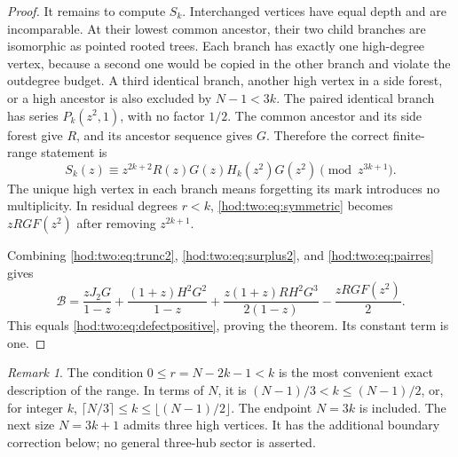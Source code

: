 \documentclass[11pt,letterpaper]{article}
\theoremstyle{definition}\newtheorem{definition}[theorem]{Definition}
\theoremstyle{remark}\newtheorem{remark}[theorem]{Remark}
\newcommand{\Bcal}{\mathcal B}
\begin{document}
\begin{proof}
It remains to compute $S_k$. Interchanged vertices have equal depth and are incomparable. At their lowest common ancestor, their two child branches are isomorphic as pointed rooted trees. Each branch has exactly one high-degree vertex, because a second one would be copied in the other branch and violate the outdegree budget. A third identical branch, another high vertex in a side forest, or a high ancestor is also excluded by $N-1<3k$. The paired identical branch has series $P_k(z^2,1)$, with no factor $1/2$. The common ancestor and its side forest give $R$, and its ancestor sequence gives $G$. Therefore the correct finite-range statement is
\begin{equation}\label{hod:two:eq:symmetric}
S_k(z)\equiv z^{2k+2}R(z)G(z)H_k(z^2)G(z^2)
\pmod {z^{3k+1}}.
\end{equation}
The unique high vertex in each branch means forgetting its mark introduces no multiplicity. In residual degrees $r<k$, \eqref{hod:two:eq:symmetric} becomes $zRGF(z^2)$ after removing $z^{2k+1}$.

Combining \eqref{hod:two:eq:trunc2}, \eqref{hod:two:eq:surplus2}, and \eqref{hod:two:eq:pairres} gives
\begin{equation}\label{hod:two:eq:defectsigned}
\Bcal=\frac{zJ_2G}{1-z}+\frac{(1+z)H^2G^2}{1-z}
+\frac{z(1+z)RH^2G^3}{2(1-z)}-\frac{zRGF(z^2)}2.
\end{equation}
This equals \eqref{hod:two:eq:defectpositive}, proving the theorem. Its constant term is one.
\end{proof}

\begin{remark}
The condition $0\le r=N-2k-1<k$ is the most convenient exact description of the range. In terms of $N$, it is $(N-1)/3<k\le(N-1)/2$, or, for integer $k$, $\lceil N/3\rceil\le k\le\lfloor(N-1)/2\rfloor$. The endpoint $N=3k$ is included. The next size $N=3k+1$ admits three high vertices. It has the additional boundary correction below; no general three-hub sector is asserted.
\end{remark}
\end{document}
